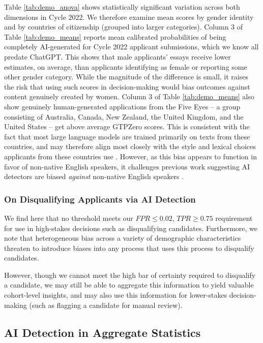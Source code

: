 Table \ref{tab:demo_anova} shows statistically significant variation across both dimensions in Cycle 2022. We therefore examine mean scores by gender identity and by countries of citizenship (grouped into larger categories). Column 3 of Table \ref{tab:demo_means} reports mean calibrated probabilities of being completely AI-generated for Cycle 2022 applicant submissions, which we know all predate ChatGPT. This shows that male applicants' essays receive lower estimates, on average, than applicants identifying as female or reporting some other gender category. While the magnitude of the difference is small, it raises the risk that using such scores in decision-making would bias outcomes against content genuinely created by women. Column 3 of Table \ref{tab:demo_means} also show genuinely human-generated applications from the Five Eyes – a group consisting of Australia, Canada, New Zealand, the United Kingdom, and the United States – get above average GTPZero scores. This is consistent with the fact that most large language models are trained primarily on texts from these countries, and may therefore align most closely with the style and lexical choices applicants from these countries use \cite{brown_language_2020}. However, as this bias appears to function in favor of non-native English speakers, it challenges previous work suggesting AI detectors are biased \textit{against} non-native English speakers \cite{liang_gpt_2023}.

\subsubsection{On Disqualifying Applicants via AI Detection}
We find here that no threshold meets our $FPR \leq 0.02$, $TPR \geq 0.75$ requirement for use in high-stakes decisions such as disqualifying candidates. Furthermore, we note that heterogeneous bias across a variety of demographic characteristics threaten to introduce biases into any process that uses this process to disqualify candidates. 

However, though we cannot meet the high bar of certainty required to disqualify a candidate, we may still be able to aggregate this information to yield valuable cohort-level insights, and may also use this information for lower-stakes decision-making (such as flagging a candidate for manual review).

\subsection{AI Detection in Aggregate Statistics}\label{ssec:res_statistics}
